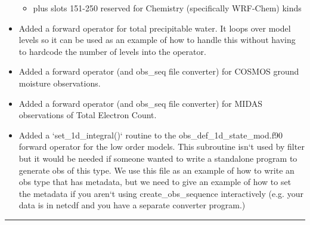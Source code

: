 \documentclass[letterpaper,10pt,english]{sphinxmanual}
\begin{document}
\begin{itemize}
\begin{itemize}
\item {} 
plus slots 151-250 reserved for Chemistry (specifically
WRF-Chem) kinds

\end{itemize}

\item {} 
Added a forward operator for total precipitable water. It loops over
model levels so it can be used as an example of how to handle this
without having to hardcode the number of levels into the operator.

\item {} 
Added a forward operator (and obs\_seq file converter) for COSMOS
ground moisture observations.

\item {} 
Added a forward operator (and obs\_seq file converter) for MIDAS
observations of Total Electron Count.

\item {} 
Added a `set\_1d\_integral()` routine to the
obs\_def\_1d\_state\_mod.f90 forward operator for the low order
models. This subroutine isn`t used by filter but it would be needed
if someone wanted to write a standalone program to generate obs of
this type. We use this file as an example of how to write an obs
type that has metadata, but we need to give an example of how to set
the metadata if you aren`t using create\_obs\_sequence interactively
(e.g. your data is in netcdf and you have a separate converter
program.)

\end{itemize}


\bigskip\hrule{}\bigskip
\end{document}
